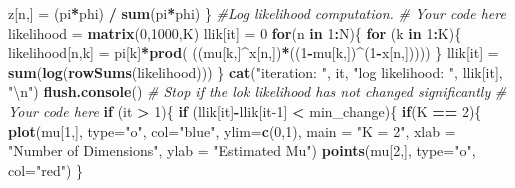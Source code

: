 \documentclass[]{article}
\newenvironment{Shaded}{\begin{snugshade}}{\end{snugshade}}
\newcommand{\CharTok}[1]{\textcolor[rgb]{0.31,0.60,0.02}{#1}}
\newcommand{\CommentTok}[1]{\textcolor[rgb]{0.56,0.35,0.01}{\textit{#1}}}
\newcommand{\ControlFlowTok}[1]{\textcolor[rgb]{0.13,0.29,0.53}{\textbf{#1}}}
\newcommand{\DataTypeTok}[1]{\textcolor[rgb]{0.13,0.29,0.53}{#1}}
\newcommand{\DecValTok}[1]{\textcolor[rgb]{0.00,0.00,0.81}{#1}}
\newcommand{\KeywordTok}[1]{\textcolor[rgb]{0.13,0.29,0.53}{\textbf{#1}}}
\newcommand{\NormalTok}[1]{#1}
\newcommand{\OperatorTok}[1]{\textcolor[rgb]{0.81,0.36,0.00}{\textbf{#1}}}
\newcommand{\StringTok}[1]{\textcolor[rgb]{0.31,0.60,0.02}{#1}}
\begin{document}
\begin{Shaded}
\begin{Highlighting}[]
\NormalTok{      z[n,] =}\StringTok{ }\NormalTok{(pi}\OperatorTok{*}\NormalTok{phi) }\OperatorTok{/}\StringTok{ }\KeywordTok{sum}\NormalTok{(pi}\OperatorTok{*}\NormalTok{phi)}
\NormalTok{    \}}
    \CommentTok{#Log likelihood computation.}
    \CommentTok{# Your code here}
\NormalTok{    likelihood =}\StringTok{ }\KeywordTok{matrix}\NormalTok{(}\DecValTok{0}\NormalTok{,}\DecValTok{1000}\NormalTok{,K)}
\NormalTok{    llik[it] =}\StringTok{ }\DecValTok{0}
    \ControlFlowTok{for}\NormalTok{(n }\ControlFlowTok{in} \DecValTok{1}\OperatorTok{:}\NormalTok{N)\{}
      \ControlFlowTok{for}\NormalTok{ (k }\ControlFlowTok{in} \DecValTok{1}\OperatorTok{:}\NormalTok{K)\{}
\NormalTok{        likelihood[n,k] =}\StringTok{ }\NormalTok{pi[k]}\OperatorTok{*}\KeywordTok{prod}\NormalTok{( ((mu[k,]}\OperatorTok{^}\NormalTok{x[n,])}\OperatorTok{*}\NormalTok{((}\DecValTok{1}\OperatorTok{-}\NormalTok{mu[k,])}\OperatorTok{^}\NormalTok{(}\DecValTok{1}\OperatorTok{-}\NormalTok{x[n,]))))}
\NormalTok{      \}}
\NormalTok{      llik[it] =}\StringTok{ }\KeywordTok{sum}\NormalTok{(}\KeywordTok{log}\NormalTok{(}\KeywordTok{rowSums}\NormalTok{(likelihood)))}
\NormalTok{    \}}
    \KeywordTok{cat}\NormalTok{(}\StringTok{"iteration: "}\NormalTok{, it, }\StringTok{"log likelihood: "}\NormalTok{, llik[it], }\StringTok{"}\CharTok{\textbackslash{}n}\StringTok{"}\NormalTok{)}
    \KeywordTok{flush.console}\NormalTok{()}
    \CommentTok{# Stop if the lok likelihood has not changed significantly}
    \CommentTok{# Your code here}
    \ControlFlowTok{if}\NormalTok{ (it }\OperatorTok{>}\StringTok{ }\DecValTok{1}\NormalTok{)\{}
      \ControlFlowTok{if}\NormalTok{ (llik[it]}\OperatorTok{-}\NormalTok{llik[it}\DecValTok{-1}\NormalTok{] }\OperatorTok{<}\StringTok{ }\NormalTok{min_change)\{}
        \ControlFlowTok{if}\NormalTok{(K }\OperatorTok{==}\StringTok{ }\DecValTok{2}\NormalTok{)\{}
          \KeywordTok{plot}\NormalTok{(mu[}\DecValTok{1}\NormalTok{,],}
               \DataTypeTok{type=}\StringTok{"o"}\NormalTok{,}
               \DataTypeTok{col=}\StringTok{"blue"}\NormalTok{,}
               \DataTypeTok{ylim=}\KeywordTok{c}\NormalTok{(}\DecValTok{0}\NormalTok{,}\DecValTok{1}\NormalTok{),}
               \DataTypeTok{main =} \StringTok{"K = 2"}\NormalTok{,}
               \DataTypeTok{xlab =} \StringTok{"Number of Dimensions"}\NormalTok{,}
               \DataTypeTok{ylab =} \StringTok{"Estimated Mu"}\NormalTok{)}
          \KeywordTok{points}\NormalTok{(mu[}\DecValTok{2}\NormalTok{,], }\DataTypeTok{type=}\StringTok{"o"}\NormalTok{, }\DataTypeTok{col=}\StringTok{"red"}\NormalTok{)}
\NormalTok{        \}}

\end{Highlighting}
\end{Shaded}
\end{document}
